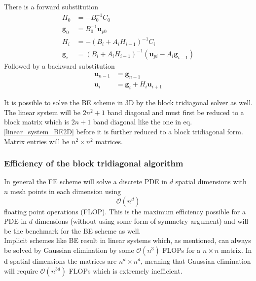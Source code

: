 \noindent There is a forward substitution
\begin{align}\label{block_tridiag_alg}
 H_0 &= -B_0^{-1}C_0\nonumber \\
 \mathbf{g}_0 &= B_0^{-1}\mathbf{u}_{p0} \nonumber\\
 H_i &= -\left(B_i+A_iH_{i-1}\right)^{-1}C_i \nonumber \\
 \mathbf{g}_i &= \left(B_i+A_iH_{i-1}\right)^{-1}\left(\mathbf{u}_{pi}-A_i\mathbf{g}_{i-1}\right)
 \end{align}
 Followed by a backward substitution
 \begin{align*}
  \mathbf{u}_{n-1} &= \mathbf{g}_{n-1}\nonumber\\
  \mathbf{u}_i &= \mathbf{g}_i + H_i\mathbf{u}_{i+1} \nonumber
 \end{align*}
 
 \noindent It is possible to solve the BE scheme in 3D by the block tridiagonal solver as well. 
 The linear system will be $2n^2 +1$ band diagonal and must first be reduced to a block matrix which is $2n+1$ band diagonal like the one in eq. \eqref{linear_system_BE2D} before it is further reduced to a block tridiagonal form. 
 Matrix entries will be $n^2\times n^2$ matrices.
 
 \subsubsection{Efficiency of the block tridiagonal algorithm}
 
 In general the FE scheme will solve a discrete PDE in $d$ spatial dimensions with $n$ mesh points in each dimension using
 \begin{equation*}
  \mathcal O(n^d)
 \end{equation*}
floating point operations (FLOP). 
This is the maximum efficiency possible for a PDE in $d$ dimensions (without using some form of symmetry argument) and will be the benchmark for the BE scheme as well.\\

Implicit schemes like BE result in linear systems which, as mentioned, can always be solved by Gaussian elimination by some $\mathcal O(n^3)$ FLOPs for a $n\times n$ matrix. 
In d spatial dimensions the matrices are $n^d\times n^d$, meaning that Gaussian elimination will require $\mathcal{O}(n^{3d})$ FLOPs which is extremely inefficient. 



